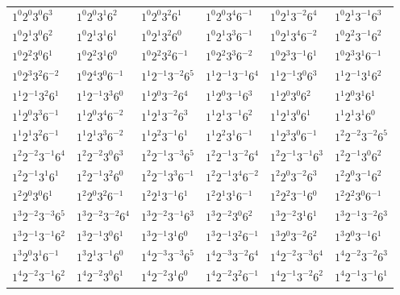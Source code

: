 \documentclass[12pt]{amsart}
\numberwithin{equation}{section}
\theoremstyle{plain}
\theoremstyle{definition}
\theoremstyle{remark}
\begin{document}
\begin{longtable}{llllll}
$1^{0}2^{0}3^{0}6^{3}$ & $1^{0}2^{0}3^{1}6^{2}$ & $1^{0}2^{0}3^{2}6^{1}$ & $1^{0}2^{0}3^{4}6^{-1}$ & $1^{0}2^{1}3^{-2}6^{4}$ & $1^{0}2^{1}3^{-1}6^{3}$\\
$1^{0}2^{1}3^{0}6^{2}$ & $1^{0}2^{1}3^{1}6^{1}$ & $1^{0}2^{1}3^{2}6^{0}$ & $1^{0}2^{1}3^{3}6^{-1}$ & $1^{0}2^{1}3^{4}6^{-2}$ & $1^{0}2^{2}3^{-1}6^{2}$\\
$1^{0}2^{2}3^{0}6^{1}$ & $1^{0}2^{2}3^{1}6^{0}$ & $1^{0}2^{2}3^{2}6^{-1}$ & $1^{0}2^{2}3^{3}6^{-2}$ & $1^{0}2^{3}3^{-1}6^{1}$ & $1^{0}2^{3}3^{1}6^{-1}$\\
$1^{0}2^{3}3^{2}6^{-2}$ & $1^{0}2^{4}3^{0}6^{-1}$ & $1^{1}2^{-1}3^{-2}6^{5}$ & $1^{1}2^{-1}3^{-1}6^{4}$ & $1^{1}2^{-1}3^{0}6^{3}$ & $1^{1}2^{-1}3^{1}6^{2}$\\
$1^{1}2^{-1}3^{2}6^{1}$ & $1^{1}2^{-1}3^{3}6^{0}$ & $1^{1}2^{0}3^{-2}6^{4}$ & $1^{1}2^{0}3^{-1}6^{3}$ & $1^{1}2^{0}3^{0}6^{2}$ & $1^{1}2^{0}3^{1}6^{1}$\\
$1^{1}2^{0}3^{3}6^{-1}$ & $1^{1}2^{0}3^{4}6^{-2}$ & $1^{1}2^{1}3^{-2}6^{3}$ & $1^{1}2^{1}3^{-1}6^{2}$ & $1^{1}2^{1}3^{0}6^{1}$ & $1^{1}2^{1}3^{1}6^{0}$\\
$1^{1}2^{1}3^{2}6^{-1}$ & $1^{1}2^{1}3^{3}6^{-2}$ & $1^{1}2^{2}3^{-1}6^{1}$ & $1^{1}2^{2}3^{1}6^{-1}$ & $1^{1}2^{3}3^{0}6^{-1}$ & $1^{2}2^{-2}3^{-2}6^{5}$\\
$1^{2}2^{-2}3^{-1}6^{4}$ & $1^{2}2^{-2}3^{0}6^{3}$ & $1^{2}2^{-1}3^{-3}6^{5}$ & $1^{2}2^{-1}3^{-2}6^{4}$ & $1^{2}2^{-1}3^{-1}6^{3}$ & $1^{2}2^{-1}3^{0}6^{2}$\\
$1^{2}2^{-1}3^{1}6^{1}$ & $1^{2}2^{-1}3^{2}6^{0}$ & $1^{2}2^{-1}3^{3}6^{-1}$ & $1^{2}2^{-1}3^{4}6^{-2}$ & $1^{2}2^{0}3^{-2}6^{3}$ & $1^{2}2^{0}3^{-1}6^{2}$\\
$1^{2}2^{0}3^{0}6^{1}$ & $1^{2}2^{0}3^{2}6^{-1}$ & $1^{2}2^{1}3^{-1}6^{1}$ & $1^{2}2^{1}3^{1}6^{-1}$ & $1^{2}2^{2}3^{-1}6^{0}$ & $1^{2}2^{2}3^{0}6^{-1}$\\
$1^{3}2^{-2}3^{-3}6^{5}$ & $1^{3}2^{-2}3^{-2}6^{4}$ & $1^{3}2^{-2}3^{-1}6^{3}$ & $1^{3}2^{-2}3^{0}6^{2}$ & $1^{3}2^{-2}3^{1}6^{1}$ & $1^{3}2^{-1}3^{-2}6^{3}$\\
$1^{3}2^{-1}3^{-1}6^{2}$ & $1^{3}2^{-1}3^{0}6^{1}$ & $1^{3}2^{-1}3^{1}6^{0}$ & $1^{3}2^{-1}3^{2}6^{-1}$ & $1^{3}2^{0}3^{-2}6^{2}$ & $1^{3}2^{0}3^{-1}6^{1}$\\
$1^{3}2^{0}3^{1}6^{-1}$ & $1^{3}2^{1}3^{-1}6^{0}$ & $1^{4}2^{-3}3^{-3}6^{5}$ & $1^{4}2^{-3}3^{-2}6^{4}$ & $1^{4}2^{-2}3^{-3}6^{4}$ & $1^{4}2^{-2}3^{-2}6^{3}$\\
$1^{4}2^{-2}3^{-1}6^{2}$ & $1^{4}2^{-2}3^{0}6^{1}$ & $1^{4}2^{-2}3^{1}6^{0}$ & $1^{4}2^{-2}3^{2}6^{-1}$ & $1^{4}2^{-1}3^{-2}6^{2}$ & $1^{4}2^{-1}3^{-1}6^{1}$\\

\end{longtable}
\end{document}
